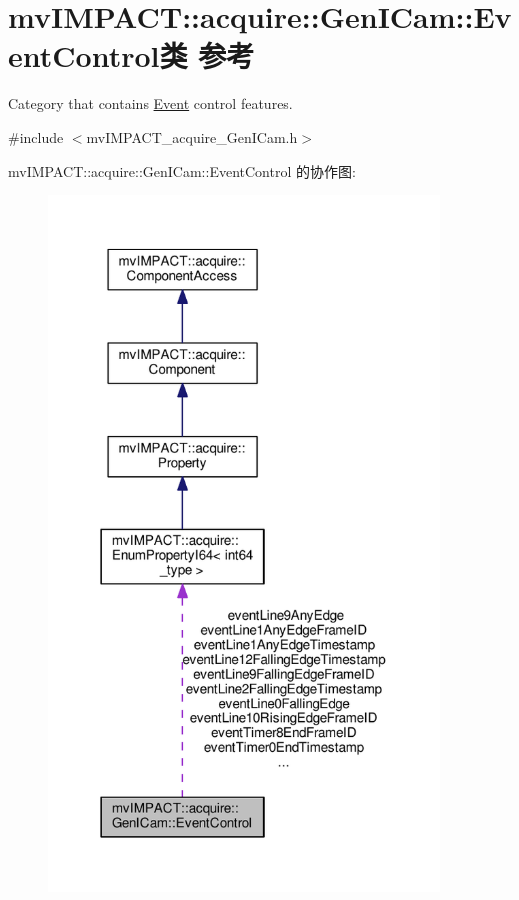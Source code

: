 \hypertarget{classmv_i_m_p_a_c_t_1_1acquire_1_1_gen_i_cam_1_1_event_control}{\section{mv\+I\+M\+P\+A\+C\+T\+:\+:acquire\+:\+:Gen\+I\+Cam\+:\+:Event\+Control类 参考}
\label{classmv_i_m_p_a_c_t_1_1acquire_1_1_gen_i_cam_1_1_event_control}
}


Category that contains \hyperlink{classmv_i_m_p_a_c_t_1_1acquire_1_1_event}{Event} control features.  




{\ttfamily \#include $<$mv\+I\+M\+P\+A\+C\+T\+\_\+acquire\+\_\+\+Gen\+I\+Cam.\+h$>$}



mv\+I\+M\+P\+A\+C\+T\+:\+:acquire\+:\+:Gen\+I\+Cam\+:\+:Event\+Control 的协作图\+:
\nopagebreak
\begin{figure}[H]
\begin{center}
\leavevmode
\includegraphics[width=294pt]{classmv_i_m_p_a_c_t_1_1acquire_1_1_gen_i_cam_1_1_event_control__coll__graph}
\end{center}
\end{figure}
